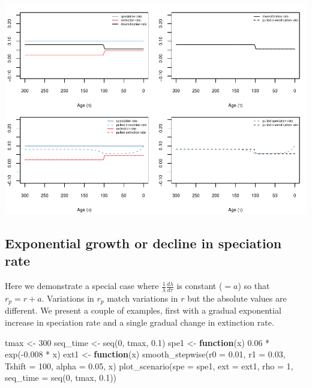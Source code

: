 \documentclass[
]{article}
\newenvironment{Shaded}{\begin{snugshade}}{\end{snugshade}}
\newcommand{\AttributeTok}[1]{\textcolor[rgb]{0.77,0.63,0.00}{#1}}
\newcommand{\ControlFlowTok}[1]{\textcolor[rgb]{0.13,0.29,0.53}{\textbf{#1}}}
\newcommand{\DecValTok}[1]{\textcolor[rgb]{0.00,0.00,0.81}{#1}}
\newcommand{\FloatTok}[1]{\textcolor[rgb]{0.00,0.00,0.81}{#1}}
\newcommand{\FunctionTok}[1]{\textcolor[rgb]{0.00,0.00,0.00}{#1}}
\newcommand{\NormalTok}[1]{#1}
\newcommand{\OtherTok}[1]{\textcolor[rgb]{0.56,0.35,0.01}{#1}}
\newcommand{\SpecialCharTok}[1]{\textcolor[rgb]{0.00,0.00,0.00}{#1}}
\begin{document}
\includegraphics{supplement_files/figure-latex/unnamed-chunk-9-1.pdf}

\pagebreak

\hypertarget{exponential-growth-or-decline-in-speciation-rate}{%
\subsection{Exponential growth or decline in speciation
rate}\label{exponential-growth-or-decline-in-speciation-rate}}

Here we demonstrate a special case where
\(\frac{1}{\lambda} \frac{d\lambda}{d\tau}\) is constant (\(= a\)) so
that \(r_p = r + a\). Variations in \(r_p\) match variations in \(r\)
but the absolute values are different. We present a couple of examples,
first with a gradual exponential increase in speciation rate and a
single gradual change in extinction rate.

\begin{Shaded}
\begin{Highlighting}[]
\NormalTok{tmax }\OtherTok{\textless{}{-}} \DecValTok{300}
\NormalTok{seq\_time }\OtherTok{\textless{}{-}} \FunctionTok{seq}\NormalTok{(}\DecValTok{0}\NormalTok{, tmax, }\FloatTok{0.1}\NormalTok{)}
\NormalTok{spe1 }\OtherTok{\textless{}{-}} \ControlFlowTok{function}\NormalTok{(x) }\FloatTok{0.06} \SpecialCharTok{*} \FunctionTok{exp}\NormalTok{(}\SpecialCharTok{{-}}\FloatTok{0.008} \SpecialCharTok{*}\NormalTok{ x)}
\NormalTok{ext1 }\OtherTok{\textless{}{-}} \ControlFlowTok{function}\NormalTok{(x) }\FunctionTok{smooth\_stepwise}\NormalTok{(}\AttributeTok{r0 =} \FloatTok{0.01}\NormalTok{, }\AttributeTok{r1 =} \FloatTok{0.03}\NormalTok{, }\AttributeTok{Tshift =} \DecValTok{100}\NormalTok{,}
    \AttributeTok{alpha =} \FloatTok{0.05}\NormalTok{, x)}
\FunctionTok{plot\_scenario}\NormalTok{(}\AttributeTok{spe =}\NormalTok{ spe1, }\AttributeTok{ext =}\NormalTok{ ext1, }\AttributeTok{rho =} \DecValTok{1}\NormalTok{, }\AttributeTok{seq\_time =} \FunctionTok{seq}\NormalTok{(}\DecValTok{0}\NormalTok{,}
\NormalTok{    tmax, }\FloatTok{0.1}\NormalTok{))}
\end{Highlighting}
\end{Shaded}
\end{document}
